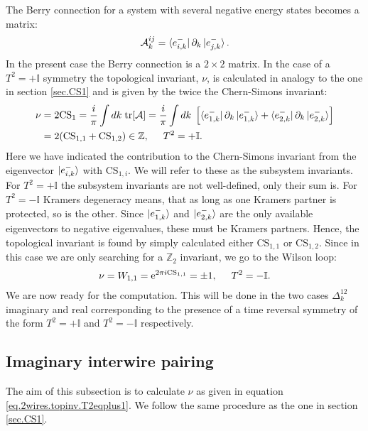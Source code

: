 The Berry connection for a system with several negative energy states becomes a matrix:
\begin{equation}
\mathcal{A}^{ij}_k = \bra{e^{-}_{i,k}}\partial_k\ket{e^{-}_{j,k}}.
\end{equation}
In the present case the Berry connection is a $2\times 2$ matrix. In the case of a $T^2 = + \mathbb{I}$ symmetry the topological invariant, $\nu$, is calculated in analogy to the one in section \ref{sec.CS1} and is given by the twice the Chern-Simons invariant:
\begin{align}
\nu &= 2\text{CS}_1 = \frac{i}{\pi} \int dk\; \text{tr}[\mathcal{A}] = \frac{i}{\pi} \int dk\; \left[\bra{e^{-}_{1,k}}\partial_k\ket{e^{-}_{1,k}} + \bra{e^{-}_{2,k}}\partial_k\ket{e^{-}_{2,k}}  \right] \nonumber \\
 &= 2(\text{CS}_{1,1} + \text{CS}_{1,2})\in \mathbb{Z}, \hspace{0.5cm} T^2 = +\mathbb{I}.
\label{eq.2wires.topinv.T2eqplus1}
\end{align}
Here we have indicated the contribution to the Chern-Simons invariant from the eigenvector $\ket{e^{-}_{i,k}}$ with $\text{CS}_{1,i}$. We will refer to these as the subsystem invariants. For $T^2 = +\mathbb{I}$ the subsystem invariants are not well-defined, only their sum is. For $T^2 = -\mathbb{I}$ Kramers degeneracy means, that as long as one Kramers partner is protected, so is the other. Since $\ket{e^{-}_{1,k}}$ and $\ket{e^{-}_{2,k}}$ are the only available eigenvectors to negative eigenvalues, these must be Kramers partners. Hence, the topological invariant is found by simply calculated either $\text{CS}_{1,1}$ or $\text{CS}_{1,2}$\cite{FuKane2006, LiYangChen, BernevigTITSC}. Since in this case we are only searching for a $\mathbb{Z}_2$ invariant, we go to the Wilson loop:
\begin{equation}
\nu = W_{1,1} = \text{e}^{2\pi i\text{CS}_{1,1}} = \pm 1, \hspace{0.5cm} T^2 = -\mathbb{I}.
\label{eq.2wires.topinv.T2eqminus1}
\end{equation}
We are now ready for the computation. This will be done in the two cases $\Delta^{12}_k$ imaginary and real corresponding to the presence of a time reversal symmetry of the form $T^2 = +\mathbb{I}$ and $T^2 = -\mathbb{I}$ respectively. 

\subsection{Imaginary interwire pairing}
\label{subsec.2wires_CSinv_Delta12imag}
The aim of this subsection is to calculate $\nu$ as given in equation \eqref{eq.2wires.topinv.T2eqplus1}. We follow the same procedure as the one in section \ref{sec.CS1}. 


